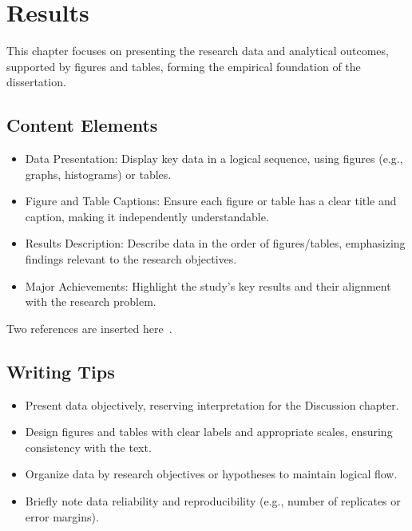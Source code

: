 \chapter{Results}
 This chapter focuses on presenting the research data and analytical outcomes, supported by figures and tables, forming the empirical foundation of the dissertation.


\section{Content Elements}
\begin{itemize}
    \item Data Presentation: Display key data in a logical sequence, using figures (e.g., graphs, histograms) or tables.
    \item Figure and Table Captions: Ensure each figure or table has a clear title and caption, making it independently understandable.
    \item Results Description: Describe data in the order of figures/tables, emphasizing findings relevant to the research objectives.
    \item Major Achievements: Highlight the study’s key results and their alignment with the research problem.


\end{itemize}

Two references are inserted here~\cite{doi:10.1021/jp211439d, PhysRevB.83.075403}.


\section{Writing Tips}
\begin{itemize}
    \item Present data objectively, reserving interpretation for the Discussion chapter.
    \item Design figures and tables with clear labels and appropriate scales, ensuring consistency with the text.
    \item Organize data by research objectives or hypotheses to maintain logical flow.
    \item Briefly note data reliability and reproducibility (e.g., number of replicates or error margins).
\end{itemize}
